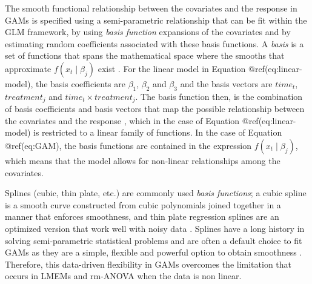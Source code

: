 \documentclass[Royal,times,sagev]{sagej}
\begin{document}
The smooth functional relationship between the covariates and the
response in GAMs is specified using a semi-parametric relationship that
can be fit within the GLM framework, by using \emph{basis function}
expansions of the covariates and by estimating random coefficients
associated with these basis functions. A \emph{basis} is a set of
functions that spans the mathematical space where the smooths that
approximate \(f(x_t\mid \beta_j)\) exist \citep{simpson2018}. For the
linear model in Equation @ref(eq:linear-model), the basis coefficients
are \(\beta_1\), \(\beta_2\) and \(\beta_3\) and the basis vectors are
\(time_t\), \(treatment_j\) and \(time_t \times treatment_j\). The basis
function then, is the combination of basis coefficients and basis
vectors that map the possible relationship between the covariates and
the response \citep{hefley2017}, which in the case of Equation
@ref(eq:linear-model) is restricted to a linear family of functions. In
the case of Equation @ref(eq:GAM), the basis functions are contained in
the expression \(f(x_t\mid \beta_j)\), which means that the model allows
for non-linear relationships among the covariates.

Splines (cubic, thin plate, etc.) are commonly used \emph{basis
functions}; a cubic spline is a smooth curve constructed from cubic
polynomials joined together in a manner that enforces smoothness, and
thin plate regression splines are an optimized version that work well
with noisy data \citep{wood2017, simpson2018}. Splines have a long
history in solving semi-parametric statistical problems and are often a
default choice to fit GAMs as they are a simple, flexible and powerful
option to obtain smoothness \citep{wegman1983}. Therefore, this
data-driven flexibility in GAMs overcomes the limitation that occurs in
LMEMs and rm-ANOVA when the data is non linear.
\end{document}
